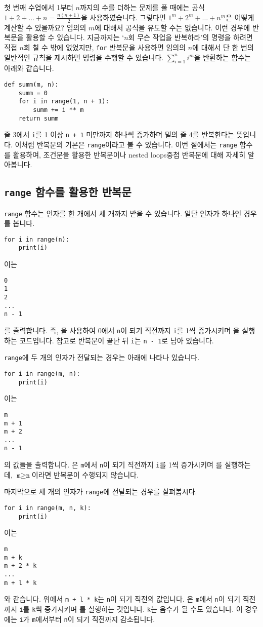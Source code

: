 \documentclass[../main.tex]{subfiles}
\begin{document}
첫 번째 수업에서 1부터 $n$까지의 수를 더하는 문제를 풀 때에는 공식
$1 + 2 + \dots + n = \frac{n(n + 1)}{2}$을 사용하였습니다.
그렇다면 $1^m + 2^m + \dots + n^m$은 어떻게 계산할 수 있을까요?
임의의 $m$에 대해서 공식을 유도할 수는 없습니다.
이런 경우에 반복문을 활용할 수 있습니다.
지금까지는 `$n$회 무슨 작업을 반복하라'의 명령을 하려면 직접 $n$회 칠 수 밖에 없었지만,  \texttt{for} 반복문을 사용하면 임의의 $n$에 대해서 단 한 번의 일반적인 규칙을 제시하면 명령을 수행할 수 있습니다.
$\sum_{i = 1}^n i^m$을 반환하는 함수는 아래와 같습니다.
\begin{verbatim}
def summ(m, n):
    summ = 0
    for i in range(1, n + 1):
        summ += i ** m
    return summ
\end{verbatim}
줄 3에서 \texttt{i}를 1 이상 \texttt{n + 1} 미만까지 하나씩 증가하며 밑의 줄 4를 반복한다는 뜻입니다.
이처럼 반복문의 기본은 \texttt{range}이라고 볼 수 있습니다.
이번 절에서는 \texttt{range} 함수를 활용하여, 조건문을 활용한 반복문이나 nested loops중첩 반복문에 대해 자세히 알아봅니다.

\subsection{\texttt{range} 함수를 활용한 반복문}
\texttt{range} 함수는 인자를 한 개에서 세 개까지 받을 수 있습니다.
일단 인자가 하나인 경우를 봅니다.
\begin{verbatim}
for i in range(n):
    print(i)
\end{verbatim}
이는
\begin{verbatim}
0
1
2
...
n - 1
\end{verbatim}
를 출력합니다.
즉, 을 사용하여 0에서 \texttt{n}이 되기 직전까지 \texttt{i}를 1씩
증가시키며 을 실행하는 코드입니다.
참고로 반복문이 끝난 뒤 \texttt{i}는 \texttt{n - 1}로 남아 있습니다.

\texttt{range}에 두 개의 인자가 전달되는 경우는 아래에 나타나 있습니다.
\begin{verbatim}
for i in range(m, n):
    print(i)
\end{verbatim}
이는
\begin{verbatim}
m
m + 1
m + 2
...
n - 1
\end{verbatim}
의 값들을 출력합니다.
은 \texttt{m}에서 \texttt{n}이 되기 직전까지 \texttt{i}를
1씩 증가시키며 를 실행하는데, $\texttt{m} \geq \texttt{n}$이라면 반복문이 수행되지 않습니다.

마지막으로 세 개의 인자가 \texttt{range}에 전달되는 경우를 살펴봅시다.
\begin{verbatim}
for i in range(m, n, k):
    print(i)
\end{verbatim}
이는
\begin{verbatim}
m
m + k
m + 2 * k
...
m + l * k
\end{verbatim}
와 같습니다.
위에서 \texttt{m + l * k}는 \texttt{n}이 되기 직전의 값입니다.
은 \texttt{m}에서 \texttt{n}이 되기 직전까지
\texttt{i}를 \texttt{k}씩 증가시키며 를 실행하는 것입니다.
\texttt{k}는 음수가 될 수도 있습니다.
이 경우에는 \texttt{i}가 \texttt{m}에서부터 \texttt{n}이 되기 직전까지 감소됩니다.
\end{document}
